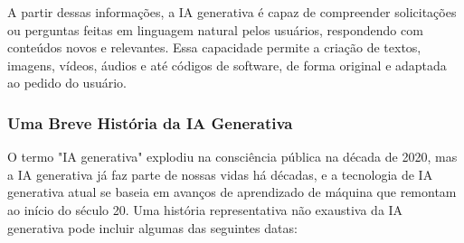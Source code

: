 \documentclass[a4paper, 12pt]{article}
\begin{document}
    A partir dessas informações, a IA generativa é capaz de compreender solicitações ou perguntas feitas em linguagem natural pelos usuários, respondendo com conteúdos novos e relevantes. Essa capacidade permite a criação de textos, imagens, vídeos, áudios e até códigos de software, de forma original e adaptada ao pedido do usuário.

    \subsubsection{Uma Breve História da IA Generativa}

    O termo "IA generativa" explodiu na consciência pública na década de 2020, mas a IA generativa já faz parte de nossas vidas há décadas, e a tecnologia de IA generativa atual se baseia em avanços de aprendizado de máquina que remontam ao início do século 20. Uma história representativa não exaustiva da IA generativa pode incluir algumas das seguintes datas:
\end{document}
